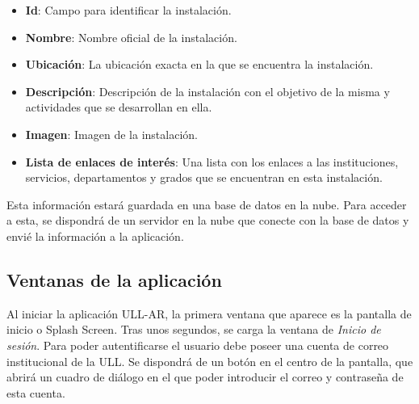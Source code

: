 \begin{itemize}
    \item \textbf{Id}: Campo para identificar la instalación.
    \item \textbf{Nombre}: Nombre oficial de la instalación.
    \item \textbf{Ubicación}: La ubicación exacta en la que se encuentra la instalación. 
    \item \textbf{Descripción}: Descripción de la instalación con el objetivo de la misma y actividades que se desarrollan en ella.
    \item \textbf{Imagen}: Imagen de la instalación.
    \item \textbf{Lista de enlaces de interés}: Una lista con los enlaces a las instituciones, servicios, departamentos y grados que se encuentran en esta instalación.
\end{itemize}

Esta información estará guardada en una base de datos en la nube. Para acceder a esta, se dispondrá de un servidor en la nube que conecte con la base de datos y envié la información a la aplicación.

\subsection{Ventanas de la aplicación}

 

  
Al iniciar la aplicación ULL-AR, la primera ventana que aparece es la pantalla de inicio o Splash Screen. Tras unos segundos, se carga la ventana de \textit{Inicio de sesión}. Para poder autentificarse el usuario debe poseer una cuenta de correo institucional de la ULL. Se dispondrá de un botón en el centro de la pantalla, que abrirá un cuadro de diálogo en el que poder introducir el correo y contraseña de esta cuenta.
  

